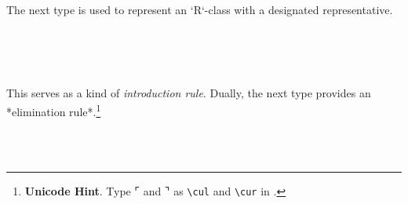 \ccpad
The next type is used to represent an `R`-class with a designated representative.
\ccpad
\begin{code}%
\>[0]\AgdaSpace{}%
\AgdaModule{\AgdaUnderscore{}}\AgdaSpace{}%
\AgdaSymbol{\{}\AgdaSpace{}%
\AgdaSpace{}%
\AgdaSymbol{:}\AgdaSpace{}%
\AgdaSymbol{\}\{}\AgdaSpace{}%
\AgdaSymbol{:}\AgdaSpace{}%
\AgdaSpace{}%
\AgdaSymbol{\}}\AgdaSpace{}%
\<%
\\
%
\\[\AgdaEmptyExtraSkip]%
\>[0][@{}l@{\AgdaIndent{0}}]%
\>[1]\AgdaSpace{}%
\AgdaSymbol{:}\AgdaSpace{}%
\AgdaSpace{}%
\AgdaSpace{}%
\AgdaSymbol{\{}\AgdaSpace{}%
\AgdaSymbol{:}\AgdaSpace{}%
\AgdaSpace{}%
\AgdaSpace{}%
\AgdaSymbol{\}}\AgdaSpace{}%
\AgdaSpace{}%
\AgdaSpace{}%
\AgdaOperator{\AgdaFunction{/}}\AgdaSpace{}%
\<%
\\
%
\>[1]\AgdaSpace{}%
\AgdaSpace{}%
\AgdaSpace{}%
\AgdaSymbol{\{}\AgdaSymbol{\}}\AgdaSpace{}%
\AgdaSymbol{=}\AgdaSpace{}%
\AgdaOperator{\AgdaFunction{[}}\AgdaSpace{}%
\AgdaSpace{}%
\AgdaOperator{\AgdaFunction{]}}\AgdaSpace{}%
\AgdaSpace{}%
\AgdaOperator{\AgdaInductiveConstructor{,}}\AgdaSpace{}%
\AgdaSpace{}%
\AgdaOperator{\AgdaInductiveConstructor{,}}\AgdaSpace{}%
\<%
\end{code}
\ccpad
This serves as a kind of \emph{introduction rule}.  Dually, the next type provides an *elimination rule*.\footnote{%
\textbf{Unicode Hint}. Type \af ⌜ and \af ⌝ as \texttt{\textbackslash{}cul} and \texttt{\textbackslash{}cur} in \agdamode.}
\ccpad
\begin{code}%
\>[1]\AgdaSpace{}%
\AgdaSymbol{:}\AgdaSpace{}%
\AgdaSymbol{\{}\AgdaSpace{}%
\AgdaSymbol{:}\AgdaSpace{}%
\AgdaSpace{}%
\AgdaSpace{}%
\AgdaSymbol{\}}\AgdaSpace{}%
\AgdaSpace{}%
\AgdaSpace{}%
\AgdaOperator{\AgdaFunction{/}}\AgdaSpace{}%
%
\>[30]\AgdaSpace{}%
\<%
\\
%
\\[\AgdaEmptyExtraSkip]%
%
\>[1]\AgdaSpace{}%
\AgdaSpace{}%
\AgdaSpace{}%
\AgdaSymbol{=}\AgdaSpace{}%
\AgdaSpace{}%
\AgdaSpace{}%
\AgdaSpace{}%
\<%
\end{code}
\scpad


